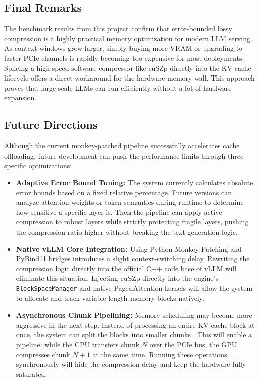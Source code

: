 \documentclass{polyu-comp}
\begin{document}
\subsection{Final Remarks}
The benchmark results from this project confirm that error-bounded lossy compression is a highly practical memory optimization for modern LLM serving. As context windows grow larger, simply buying more VRAM or upgrading to faster PCIe channels is rapidly becoming too expensive for most deployments. Splicing a high-speed software compressor like cuSZp directly into the KV cache lifecycle offers a direct workaround for the hardware memory wall. This approach proves that large-scale LLMs \cite{10.1145/3706418} can run efficiently without a lot of hardware expansion.

\subsection{Future Directions}
Although the current monkey-patched pipeline successfully accelerates cache offloading, future development can push the performance limits through three specific optimizations:

\begin{itemize}
    \item \textbf{Adaptive Error Bound Tuning:} The system currently calculates absolute error bounds based on a fixed relative percentage. Future versions can analyze attention weights \cite{zhang2023h2oheavyhitteroracleefficient} or token semantics during runtime to determine how sensitive a specific layer is. Then the pipeline can apply active compression to robust layers while strictly protecting fragile layers, pushing the compression ratio higher without breaking the text generation logic.
    
    \item \textbf{Native vLLM Core Integration:} Using Python Monkey-Patching and PyBind11 bridges introduces a slight context-switching delay. Rewriting the compression logic directly into the official C++ code base of vLLM will eliminate this situation. Injecting cuSZp directly into the engine's \texttt{BlockSpaceManager} and native PagedAttention kernels will allow the system to allocate and track variable-length memory blocks natively.
    
    \item \textbf{Asynchronous Chunk Pipelining:} Memory scheduling may become more aggressive in the next step. Instead of processing an entire KV cache block at once, the system can split the blocks into smaller chunks \cite{10.1145/3458817.3476145}. This will enable a pipeline: while the CPU transfers chunk $N$ over the PCIe bus, the GPU compresses chunk $N+1$ at the same time. Running these operations synchronously will hide the compression delay and keep the hardware fully saturated.
\end{itemize}

\clearpage
{}


\end{document}
